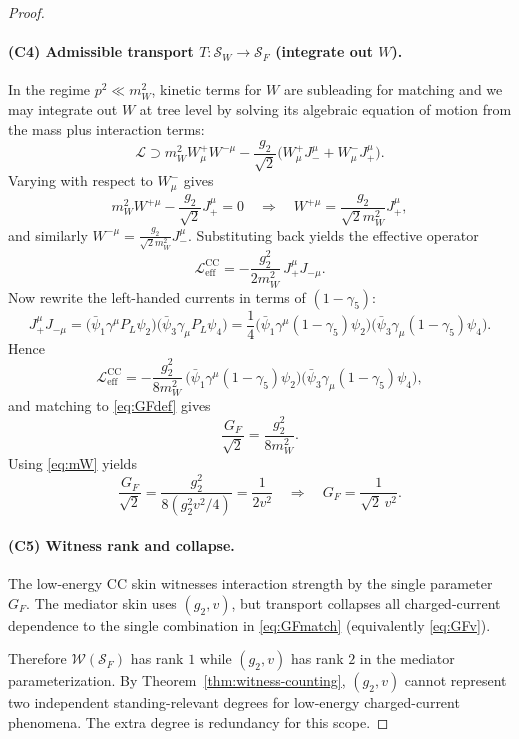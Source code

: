 \documentclass[11pt]{article}
\theoremstyle{remark}
\newcommand{\CC}{\ensuremath{\mathrm{CC}}}
\newcommand{\Skin}{\mathcal{S}}
\newcommand{\Wit}{\mathcal{W}}
\begin{document}
\begin{proof}
\paragraph{(C4) Admissible transport $T:\Skin_W\to\Skin_F$ (integrate out $W$).}
In the regime $p^2\ll m_W^2$, kinetic terms for $W$ are subleading for matching and we may integrate out
$W$ at tree level by solving its algebraic equation of motion from the mass plus interaction terms:
\begin{equation}
\mathcal{L}\supset m_W^2 W^+_\mu W^{-\mu} -\frac{g_2}{\sqrt2}\Big(W^+_\mu J_-^\mu+W^-_\mu J_+^\mu\Big).
\end{equation}
Varying with respect to $W^-_\mu$ gives
\begin{equation}
m_W^2 W^{+\mu} - \frac{g_2}{\sqrt2}J_+^\mu =0
\quad\Rightarrow\quad
W^{+\mu}=\frac{g_2}{\sqrt2 m_W^2}J_+^\mu,
\end{equation}
and similarly $W^{-\mu}=\frac{g_2}{\sqrt2 m_W^2}J_-^\mu$. Substituting back yields the effective operator
\begin{equation}\label{eq:LeffJJ}
\mathcal{L}_{\mathrm{eff}}^{\CC}
=
-\frac{g_2^2}{2m_W^2}\, J_+^\mu J_{-\mu}.
\end{equation}
Now rewrite the left-handed currents in terms of $(1-\gamma_5)$:
\begin{equation}
J_+^\mu J_{-\mu}
=
\big(\bar\psi_1\gamma^\mu P_L\psi_2\big)\big(\bar\psi_3\gamma_\mu P_L\psi_4\big)
=
\frac{1}{4}\big(\bar\psi_1\gamma^\mu (1-\gamma_5)\psi_2\big)\big(\bar\psi_3\gamma_\mu (1-\gamma_5)\psi_4\big).
\end{equation}
Hence
\begin{equation}\label{eq:matchGF}
\mathcal{L}_{\mathrm{eff}}^{\CC}
=
-\frac{g_2^2}{8m_W^2}\,
\big(\bar\psi_1\gamma^\mu (1-\gamma_5)\psi_2\big)\big(\bar\psi_3\gamma_\mu (1-\gamma_5)\psi_4\big),
\end{equation}
and matching to \eqref{eq:GFdef} gives
\begin{equation}\label{eq:GFmatch}
\frac{G_F}{\sqrt2}=\frac{g_2^2}{8m_W^2}.
\end{equation}
Using \eqref{eq:mW} yields
\begin{equation}\label{eq:GFv}
\frac{G_F}{\sqrt2}=\frac{g_2^2}{8(g_2^2 v^2/4)}=\frac{1}{2v^2}
\quad\Rightarrow\quad
G_F=\frac{1}{\sqrt2\,v^2}.
\end{equation}

\paragraph{(C5) Witness rank and collapse.}
The low-energy $\CC$ skin witnesses interaction strength by the single parameter $G_F$.
The mediator skin uses $(g_2,v)$, but transport collapses all charged-current dependence to the
single combination in \eqref{eq:GFmatch} (equivalently \eqref{eq:GFv}).

Therefore $\Wit(\Skin_F)$ has rank $1$ while $(g_2,v)$ has rank $2$ in the mediator parameterization.
By Theorem~\ref{thm:witness-counting}, $(g_2,v)$ cannot represent two independent standing-relevant
degrees for low-energy charged-current phenomena. The extra degree is redundancy for this scope.
\end{proof}
\end{document}
